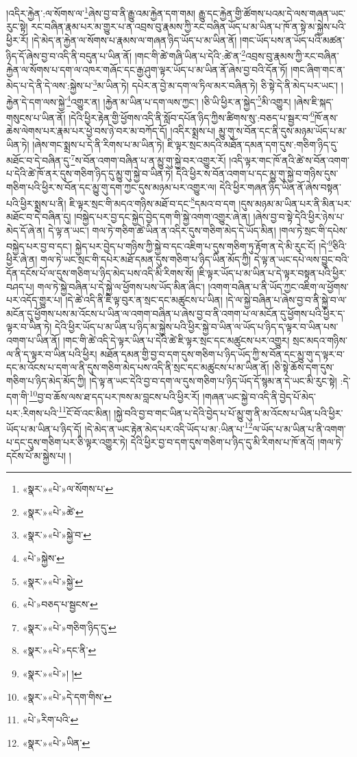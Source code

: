 །འདིར་རྐྱེན་:ལ་སོགས་ལ་\footnote{«སྣར་»«པེ་»ལ་སོགས་པ་}ཞེས་བྱ་བ་ནི་རྒྱུ་འམ་རྐྱེན་དག་གམ། རྒྱུ་དང་རྐྱེན་གྱི་ཚོགས་པའམ་དེ་ལས་གཞན་ཡང་རུང་སྟེ། རང་བཞིན་རྣམ་པར་མ་གྱུར་པ་ན་འབྲས་བུ་རྣམས་ཀྱི་རང་བཞིན་ཡོད་པ་མ་ཡིན་པ་ཁོ་ན་སྟེ་མ་སྐྱེས་པའི་ཕྱིར་རོ། །དེ་མེད་ན་རྐྱེན་ལ་སོགས་པ་རྣམས་ལ་གཞན་ཉིད་ཡོད་པ་མ་ཡིན་ནོ། །གང་ཡོད་པས་ན་ཡོད་པའི་མཚན་ཉིད་དོ་ཞེས་བྱ་བ་འདི་ནི་བདུན་པ་ཡིན་ནོ། །གང་གི་ཚེ་གཞི་ཡིན་པ་དེའི་:ཚེ་ན་\footnote{«སྣར་»«པེ་»ཚེ་}འབྲས་བུ་རྣམས་ཀྱི་རང་བཞིན་རྐྱེན་ལ་སོགས་པ་དག་ལ་འཁར་གཞོང་དང་རྒྱ་ཤུག་ལྟར་ཡོད་པ་མ་ཡིན་ནོ་ཞེས་བྱ་བའི་དོན་ཏོ། །གང་ཞིག་གང་ན་མེད་པ་དེ་ནི་དེ་ལས་:སྐྱེས་པ་\footnote{«སྣར་»«པེ་»སྐྱེ་བ་}མ་ཡིན་ཏེ། དཔེར་ན་བྱེ་མ་དག་ལ་ཏིལ་མར་བཞིན་ཏེ། ཅི་སྟེ་དེ་ནི་མེད་པར་ཡང་། །རྐྱེན་དེ་དག་ལས་སྐྱེ་\footnote{«པེ་»སྐྱེས་}འགྱུར་ན། །རྐྱེན་མ་ཡིན་པ་དག་ལས་ཀྱང་། །ཅི་ཡི་ཕྱིར་ན་སྐྱེད་\footnote{«སྣར་»«པེ་»སྐྱེ་}མི་འགྱུར། །ཞེས་ཇི་སྐད་གསུངས་པ་ཡིན་ནོ། །དེའི་ཕྱིར་རྟེན་གྱི་ཕྱོགས་འདི་ནི་སློབ་དཔོན་ཉིད་ཀྱིས་ཚིགས་སུ་:བཅད་པ་སྦྱར་བ་\footnote{«པེ་»བཅད་པ་སྦྱངས་}ཁོ་ནས་ཆེས་ལེགས་པར་རྣམ་པར་ཕྱེ་བས་ཉེ་བར་མ་བཀོད་དོ། །འདིར་སྨྲས་པ། མྱུ་གུ་ས་བོན་དང་ནི་དུས་མཉམ་ཡོད་པ་མ་ཡིན་ཏེ། །ཞེས་གང་སྨྲས་པ་དེ་ནི་རིགས་པ་མ་ཡིན་ཏེ། ཇི་ལྟར་སྲང་མདའི་མཐོན་དམན་དག་དུས་:གཅིག་ཉིད་དུ་མཐོང་བ་དེ་བཞིན་དུ་\footnote{«སྣར་»«པེ་»གཅིག་ཉིད་དུ་}ས་བོན་འགག་བཞིན་པ་ན་མྱུ་གུ་སྐྱེ་བར་འགྱུར་རོ། །འདི་ལྟར་གང་ཁོ་ནའི་ཚེ་ས་བོན་འགག་པ་དེའི་ཚེ་ཁོ་ནར་དུས་གཅིག་ཉིད་དུ་མྱུ་གུ་སྐྱེ་བ་ཡིན་ཏེ། དེའི་ཕྱིར་ས་བོན་འགག་པ་དང་མྱུ་གུ་སྐྱེ་བ་གཉིས་དུས་གཅིག་པའི་ཕྱིར་ས་བོན་དང་མྱུ་གུ་དག་ཀྱང་དུས་མཉམ་པར་འགྱུར་ལ། དེའི་ཕྱིར་གཞན་ཉིད་ཡིན་ནོ་ཞེས་བསྟན་པའི་ཕྱིར་སྨྲས་པ་ནི། ཇི་ལྟར་སྲང་གི་མདའ་གཉིས་མཐོ་བ་དང་\footnote{«སྣར་»«པེ་»དང་ནི་}དམའ་བ་དག །དུས་མཉམ་མ་ཡིན་པར་ནི་མིན་པར་མཐོང་བ་དེ་བཞིན་དུ། །བསྐྱེད་པར་བྱ་དང་སྐྱེད་བྱེད་དག་གི་སྐྱེ་འགག་འགྱུར་ཞེ་ན། །ཞེས་བྱ་བ་སྟེ་དེའི་ཕྱིར་ཉེས་པ་མེད་དོ་ཞེ་ན། དེ་ལྟ་ན་ཡང་། གལ་ཏེ་གཅིག་ཚེ་ཡིན་ན་འདིར་དུས་གཅིག་མེད་དེ་ཡོད་མིན། །གལ་ཏེ་སྲང་གི་དཔེས་བསྐྱེད་པར་བྱ་བ་དང་། སྐྱེད་པར་བྱེད་པ་གཉིས་ཀྱི་སྐྱེ་བ་དང་འཇིག་པ་དུས་གཅིག་ཏུ་རྟོག་ན་དེ་མི་རུང་ངོ། །དེ་\footnote{«སྣར་»«པེ་»། །}ཅིའི་ཕྱིར་ཞེ་ན། གལ་ཏེ་ཡང་སྲང་གི་དཔེར་མཐོ་དམན་དུས་གཅིག་པ་ཉིད་ཡིན་མོད་ཀྱི། དེ་ལྟ་ན་ཡང་དཔེ་ལས་བྱུང་བའི་དོན་དངོས་པོ་ལ་དུས་གཅིག་པ་ཉིད་མེད་པས་འདི་མི་རིགས་སོ། །ཇི་ལྟར་ཡོད་པ་མ་ཡིན་པ་དེ་ལྟར་བསྟན་པའི་ཕྱིར་བཤད་པ། གལ་ཏེ་སྐྱེ་བཞིན་པ་དེ་སྐྱེ་ལ་ཕྱོགས་པས་ཡོད་མིན་ཞིང་། །འགག་བཞིན་པ་ནི་ཡོད་ཀྱང་འཇིག་ལ་ཕྱོགས་པར་འདོད་གྱུར་པ། །དེ་ཚེ་འདི་ནི་ཇི་ལྟ་བུར་ན་སྲང་དང་མཚུངས་པ་ཡིན། །དེ་ལ་སྐྱེ་བཞིན་པ་ཞེས་བྱ་བ་ནི་སྐྱེ་བ་ལ་མངོན་དུ་ཕྱོགས་པས་མ་འོངས་པ་ཡིན་ལ་འགག་བཞིན་པ་ཞེས་བྱ་བ་ནི་འགག་པ་ལ་མངོན་དུ་ཕྱོགས་པའི་ཕྱིར་ད་ལྟར་བ་ཡིན་ཏེ། དེའི་ཕྱིར་ཡོད་པ་མ་ཡིན་པ་ཉིད་མ་སྐྱེས་པའི་ཕྱིར་སྐྱེ་བ་ཡིན་ལ་ཡོད་པ་ཉིད་ད་ལྟར་བ་ཡིན་པས་འགག་པ་ཡིན་ནོ། །གང་གི་ཚེ་འདི་དེ་ལྟར་ཡིན་པ་དེའི་ཚེ་ཇི་ལྟར་སྲང་དང་མཚུངས་པར་འགྱུར། སྲང་མདའ་གཉིས་ལ་ནི་ད་ལྟར་བ་ཡིན་པའི་ཕྱིར། མཐོན་དམན་གྱི་བྱ་བ་དག་དུས་གཅིག་པ་ཉིད་ཡོད་ཀྱི་ས་བོན་དང་མྱུ་གུ་ད་ལྟར་བ་དང་མ་འོངས་པ་དག་ལ་ནི་དུས་གཅིག་མེད་པས་འདི་ནི་སྲང་དང་མཚུངས་པ་མ་ཡིན་ནོ། །ཅི་སྟེ་ཆོས་དག་དུས་གཅིག་པ་ཉིད་མེད་མོད་ཀྱི། །དེ་ལྟ་ན་ཡང་དེའི་བྱ་བ་དག་ལ་དུས་གཅིག་པ་ཉིད་ཡོད་དོ་སྙམ་ན་དེ་ཡང་མི་རུང་སྟེ། :དེ་དག་གི་\footnote{«སྣར་»«པེ་»དེ་དག་གིས་}བྱ་བ་ཆོས་ལས་ཐ་དད་པར་ཁས་མ་བླངས་པའི་ཕྱིར་རོ། །གཞན་ཡང་སྐྱེ་བ་འདི་ནི་བྱེད་པོ་མེད་པར་:རིགས་པའི་\footnote{«པེ་»རིག་པའི་}ངོ་བོ་འང་མིན། །སྐྱེ་བའི་བྱ་བ་གང་ཡིན་པ་དེའི་བྱེད་པ་པོ་མྱུ་གུ་ནི་མ་འོངས་པ་ཡིན་པའི་ཕྱིར་ཡོད་པ་མ་ཡིན་པ་ཉིད་དོ། །དེ་མེད་ན་ཡང་རྟེན་མེད་པར་འདི་ཡོད་པ་མ་:ཡིན་པ་\footnote{«སྣར་»«པེ་»ཡིན་}ལ་ཡོད་པ་མ་ཡིན་པ་ནི་འགག་པ་དང་དུས་གཅིག་པར་ཅི་ལྟར་འགྱུར་ཏེ། དེའི་ཕྱིར་བྱ་བ་དག་དུས་གཅིག་པ་ཉིད་དུ་མི་རིགས་པ་ཁོ་ནའོ། །གལ་ཏེ་དངོས་པོ་མ་སྐྱེས་པ། །
